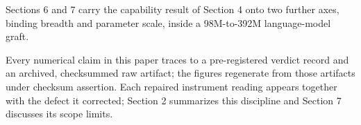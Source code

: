 Sections 6 and 7 carry the capability result of Section 4 onto two further axes, binding breadth and parameter scale, inside a 98M-to-392M language-model graft.

Every numerical claim in this paper traces to a pre-registered verdict
record and an archived, checksummed raw artifact; the figures regenerate
from those artifacts under checksum assertion. Each repaired instrument
reading appears together with the defect it corrected; Section 2
summarizes this discipline and Section 7 discusses its scope limits.

